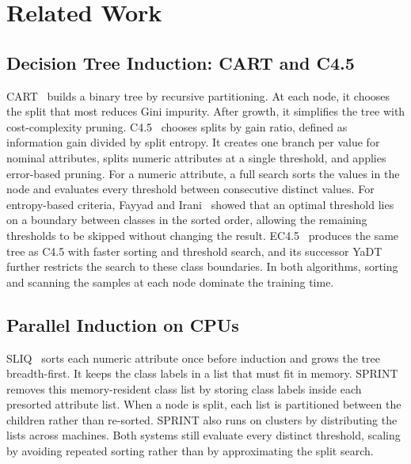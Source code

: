\section{Related Work}
\label{sec:related}

\subsection{Decision Tree Induction: CART and C4.5}

CART~\cite{breiman1984cart} builds a binary tree by recursive partitioning. At each node, it chooses the split that most reduces Gini impurity. After growth, it simplifies the tree with cost-complexity pruning. C4.5~\cite{quinlan1993c45} chooses splits by gain ratio, defined as information gain divided by split entropy. It creates one branch per value for nominal attributes, splits numeric attributes at a single threshold, and applies error-based pruning. For a numeric attribute, a full search sorts the values in the node and evaluates every threshold between consecutive distinct values. For entropy-based criteria, Fayyad and Irani~\cite{fayyad1992continuous} showed that an optimal threshold lies on a boundary between classes in the sorted order, allowing the remaining thresholds to be skipped without changing the result. EC4.5~\cite{ruggieri2002yadt} produces the same tree as C4.5 with faster sorting and threshold search, and its successor YaDT~\cite{ruggieri2004yadt} further restricts the search to these class boundaries. In both algorithms, sorting and scanning the samples at each node dominate the training time.

\subsection{Parallel Induction on CPUs}

SLIQ~\cite{mehta1996sliq} sorts each numeric attribute once before induction and grows the tree breadth-first. It keeps the class labels in a list that must fit in memory. SPRINT~\cite{shafer1996sprint} removes this memory-resident class list by storing class labels inside each presorted attribute list. When a node is split, each list is partitioned between the children rather than re-sorted. SPRINT also runs on clusters by distributing the lists across machines. Both systems still evaluate every distinct threshold, scaling by avoiding repeated sorting rather than by approximating the split search.

